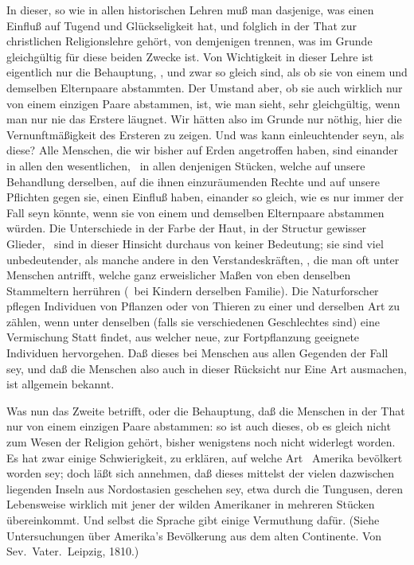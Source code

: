 \begin{aufza}
\item In dieser, so wie in allen historischen Lehren muß man dasjenige, was einen Einfluß auf Tugend und Glückseligkeit hat, und folglich in der That zur christlichen Religionslehre gehört, von demjenigen trennen, was im Grunde gleichgültig für diese beiden Zwecke ist. Von Wichtigkeit in dieser Lehre ist eigentlich nur die Behauptung, , und zwar so gleich sind, als ob sie von einem und demselben Elternpaare abstammten. Der Umstand aber, ob sie auch wirklich nur von einem einzigen Paare abstammen, ist, wie man sieht, sehr gleichgültig, wenn man nur nie das Erstere läugnet. Wir hätten also im Grunde nur nöthig, hier die Vernunftmäßigkeit des Ersteren zu zeigen. Und was kann einleuchtender seyn, als diese? Alle Menschen, die wir bisher auf Erden angetroffen haben, sind einander in allen den wesentlichen, \dh\ in allen denjenigen Stücken, welche auf unsere Behandlung derselben, auf die ihnen einzuräumenden Rechte und auf unsere Pflichten gegen sie, einen Einfluß haben, einander so gleich, wie es nur immer der Fall seyn könnte, wenn sie von einem und demselben Elternpaare abstammen würden. Die Unterschiede in der Farbe der Haut, in der Structur gewisser Glieder, \usw\ sind in dieser Hinsicht durchaus von keiner Bedeutung; sie sind viel unbedeutender, als manche andere in den Verstandeskräften, \udgl , die man oft unter Menschen antrifft, welche ganz erweislicher Maßen von eben denselben Stammeltern herrühren (\zB\ bei Kindern derselben Familie). Die Naturforscher pflegen Individuen von Pflanzen oder von Thieren zu einer und derselben Art zu zählen, wenn unter denselben (falls sie verschiedenen Geschlechtes sind) eine Vermischung Statt findet, aus welcher neue, zur Fortpflanzung geeignete Individuen hervorgehen. Daß dieses bei Menschen aus allen Gegenden der Fall sey, und daß die Menschen also auch in dieser Rücksicht nur Eine Art ausmachen, ist allgemein bekannt.
\item Was nun das Zweite betrifft, oder die Behauptung, daß die Menschen in der That nur von einem einzigen Paare abstammen: so ist auch dieses, ob es gleich nicht zum Wesen der Religion gehört, bisher wenigstens noch nicht widerlegt worden. Es hat zwar einige Schwierigkeit, zu erklären, auf welche Art \zB\ Amerika bevölkert worden sey; doch läßt sich annehmen, daß dieses mittelst der vielen dazwischen liegenden Inseln aus Nordostasien geschehen sey, etwa durch die Tungusen, deren Lebensweise wirklich mit jener der wilden Amerikaner in mehreren Stücken übereinkommt. Und selbst die Sprache gibt einige Vermuthung dafür. (Siehe Untersuchungen über Amerika's Bevölkerung aus dem alten Continente. Von Sev.\ Vater.\ Leipzig, 1810.)
\end{aufza}

